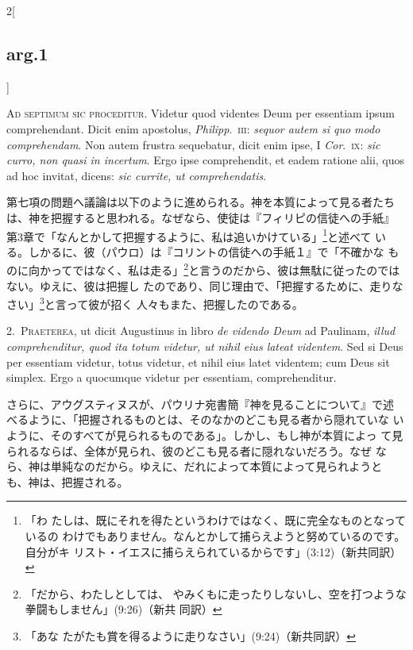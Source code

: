 \documentclass[paper=a4paper,fontsize=10pt,jafontsize=9pt,titlepage]{jlreq}
\begin{document}
\begin{paracol}{2}[\subsection{arg.1}]

{\scshape \large Ad septimum sic proceditur}. Videtur quod videntes Deum
 per essentiam ipsum comprehendant. Dicit enim apostolus, {\itshape
 Philipp}.\ {\scshape iii}: {\itshape sequor autem si quo modo
 comprehendam}. Non autem frustra sequebatur, dicit enim ipse, I {\itshape
 Cor}.\ {\scshape ix}: {\itshape sic curro, non quasi in incertum}. Ergo ipse
 comprehendit, et eadem ratione alii, quos ad hoc invitat, dicens:
 {\itshape sic currite, ut comprehendatis}.

\switchcolumn

第七項の問題へ議論は以下のように進められる。神を本質によって見る者たち
は、神を把握すると思われる。なぜなら、使徒は『フィリピの信徒への手紙』
第3章で「なんとかして把握するように、私は追いかけている」\footnote{「わ
たしは、既にそれを得たというわけではなく、既に完全なものとなっているの
わけでもありません。なんとかして捕らえようと努めているのです。自分がキ
リスト・イエスに捕らえられているからです」(3:12)（新共同訳）}と述べて
いる。しかるに、彼（パウロ）は『コリントの信徒への手紙１』で「不確かな
ものに向かってではなく、私は走る」\footnote{「だから、わたしとしては、
やみくもに走ったりしないし、空を打つような拳闘もしません」(9:26)（新共
同訳）}と言うのだから、彼は無駄に従ったのではない。ゆえに、彼は把握し
たのであり、同じ理由で、「把握するために、走りなさい」\footnote{「あな
たがたも賞を得るように走りなさい」(9:24)（新共同訳）}と言って彼が招く
人々もまた、把握したのである。


2.~{\scshape  Praeterea}, ut dicit Augustinus in libro {\itshape de videndo Deum}
 ad Paulinam, {\itshape illud comprehenditur, quod ita totum videtur, ut nihil
 eius lateat videntem}. Sed si Deus per essentiam videtur, totus videtur,
 et nihil eius latet videntem; cum Deus sit simplex. Ergo a quocumque
 videtur per essentiam, comprehenditur.

\switchcolumn

さらに、アウグスティヌスが、パウリナ宛書簡『神を見ることについて』で述
べるように、「把握されるものとは、そのなかのどこも見る者から隠れていな
いように、そのすべてが見られるものである」。しかし、もし神が本質によっ
て見られるならば、全体が見られ、彼のどこも見る者に隠れないだろう。なぜ
なら、神は単純なのだから。ゆえに、だれによって本質によって見られようと
も、神は、把握される。


\end{paracol}
\end{document}
